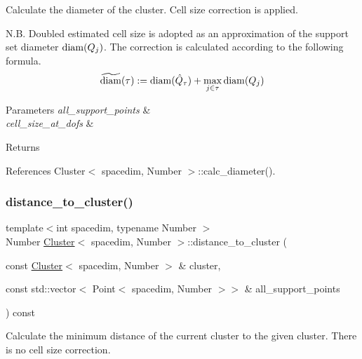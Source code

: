 Calculate the diameter of the cluster. Cell size correction is applied.

N.\+B. Doubled estimated cell size is adopted as an approximation of the support set diameter ${\rm diam}(Q_j)$. The correction is calculated according to the following formula. \[ \widetilde{\rm diam}(\tau) := {\rm diam}(\hat{Q}_{\tau}) + \max_{j \in \tau} {\rm diam}(Q_j) \] 
\begin{DoxyParams}{Parameters}
{\em all\+\_\+support\+\_\+points} & \\
\hline
{\em cell\+\_\+size\+\_\+at\+\_\+dofs} & \\
\hline
\end{DoxyParams}
\begin{DoxyReturn}{Returns}

\end{DoxyReturn}


References Cluster$<$ spacedim, Number $>$\+::calc\+\_\+diameter().

\mbox{\label{classCluster_aba84e3743344f360ccdb855037e1b45e}} 
\subsubsection{\texorpdfstring{distance\+\_\+to\+\_\+cluster()}{distance\_to\_cluster()}\hspace{0.1cm}{\footnotesize\ttfamily [1/2]}}
{\footnotesize\ttfamily template$<$int spacedim, typename Number $>$ \\
Number \hyperlink{classCluster}{Cluster}$<$ spacedim, Number $>$\+::distance\+\_\+to\+\_\+cluster (\begin{DoxyParamCaption}\item[{const \hyperlink{classCluster}{Cluster}$<$ spacedim, Number $>$ \&}]{cluster,  }\item[{const std\+::vector$<$ Point$<$ spacedim, Number $>$$>$ \&}]{all\+\_\+support\+\_\+points }\end{DoxyParamCaption}) const}

Calculate the minimum distance of the current cluster to the given cluster. There is no cell size correction. \mbox{\label{classCluster_a1eeffaea84b84d0288544dd4ff007d7b}} 
